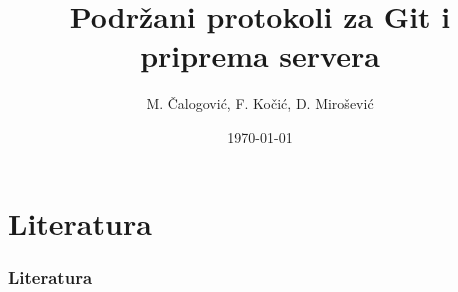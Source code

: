 \documentclass{beamer}
\title{Podržani protokoli za Git i priprema servera}
\author{M. Čalogović, F. Kočić, D. Mirošević}
\institute{Sveučilište u Rijeci - Tehnički fakultet}
\date{\today}
\begin{document}
\titlepage











\section{Literatura}
\begin{frame}
\frametitle{Literatura}


\end{frame}
\end{document}

